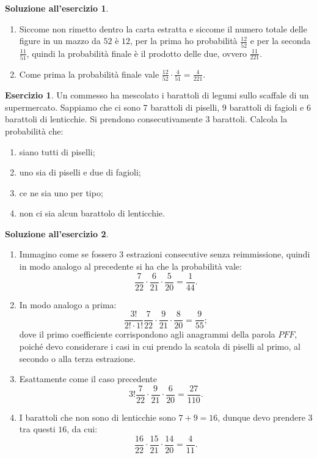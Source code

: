 \documentclass[12pt,a4paper]{article}
\theoremstyle{definition}
\newtheorem{sol}{Soluzione all'esercizio}
\newtheorem{exe}{Esercizio}
\begin{document}
\begin{sol}\mbox{}\vspace{-0.7cm}\\
	\begin{enumerate}
		\item Siccome non rimetto dentro la carta estratta e siccome il numero totale delle figure in un mazzo da $ 52 $ è $ 12 $, per la prima ho probabilità $ \frac{12}{52} $ e per la seconda $ \frac{11}{51} $, quindi la probabilità finale è il prodotto delle due, ovvero $ \frac{11}{221}. $
		\item Come prima la probabilità finale vale $ \frac{12}{52} \cdot \frac{4}{51} = \frac{4}{221} $.
	\end{enumerate}
\end{sol}

\begin{exe}
	Un commesso ha mescolato i barattoli di legumi sullo scaffale di un supermercato. Sappiamo che ci sono $ 7 $ barattoli di piselli, $ 9 $ barattoli di fagioli e $ 6 $ barattoli di lenticchie. Si prendono consecutivamente $ 3 $ barattoli. Calcola la probabilità che:
	\begin{enumerate}
		\item siano tutti di piselli;
		\item uno sia di piselli e due di fagioli;
		\item ce ne sia uno per tipo;
		\item non ci sia alcun barattolo di lenticchie.
	\end{enumerate}
\end{exe}

\begin{sol}\mbox{}\vspace{-0.7cm}\\
	\begin{enumerate}
		\item Immagino come se fossero $ 3 $ estrazioni consecutive senza reimmissione, quindi in modo analogo al precedente si ha che la probabilità vale:
		      \[ \frac{7}{22}\cdot \frac{6}{21}\cdot \frac{5}{20} = \frac{1}{44}. \]
		\item In modo analogo a prima:
		      \[ \frac{3!}{2!\cdot1!} \frac{7}{22}\cdot \frac{9}{21}\cdot \frac{8}{20} = \frac{9}{55}; \]
		      dove il primo coefficiente corrispondono agli anagrammi della parola $ PFF $, poiché devo considerare i casi in cui prendo la scatola di piselli al primo, al secondo o alla terza estrazione.
		\item Esattamente come il caso precedente
		      \[ 3! \frac{7}{22}\cdot \frac{9}{21}\cdot \frac{6}{20} = \frac{27}{110}. \]
		\item I barattoli che non sono di lenticchie sono $ 7+9=16 $, dunque devo prendere $ 3 $ tra questi $ 16 $, da cui:
		      \[ \frac{16}{22}\cdot \frac{15}{21}\cdot \frac{14}{20} = \frac{4}{11}. \]
	\end{enumerate}
\end{sol}
\end{document}
